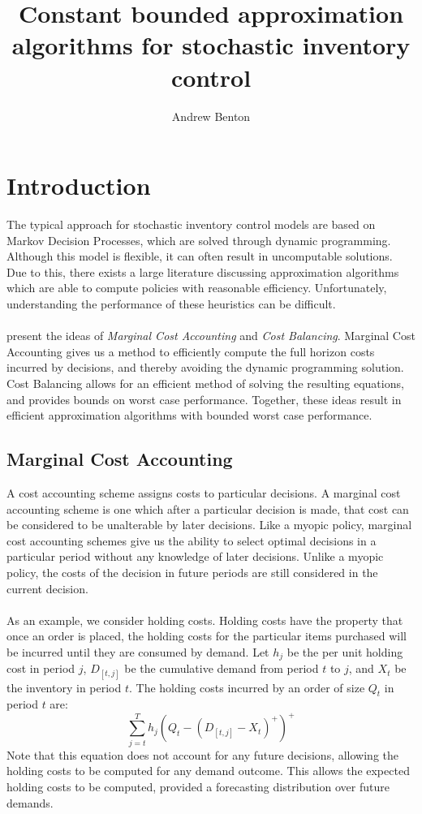 \documentclass[12pt]{article}
\author{Andrew Benton}
\title{Constant bounded approximation algorithms for stochastic inventory control}
\begin{document}
\maketitle

\section{Introduction}

The typical approach for stochastic inventory control models are based on Markov Decision Processes, which are solved through dynamic programming. Although this model is flexible, it can often result in uncomputable solutions. Due to this, there exists a large literature discussing approximation algorithms which are able to compute policies with reasonable efficiency. Unfortunately, understanding the performance of these heuristics can be difficult.\\
\\ 
\cite{levi:2007} present the ideas of \textit{Marginal Cost Accounting} and \textit{Cost Balancing}. Marginal Cost Accounting gives us a method to efficiently compute the full horizon costs incurred by decisions, and thereby avoiding the dynamic programming solution. Cost Balancing allows for an efficient method of solving the resulting equations, and provides bounds on worst case performance. Together, these ideas result in efficient approximation algorithms with bounded worst case performance. 


\subsection{Marginal Cost Accounting}

A cost accounting scheme assigns costs to particular decisions. A marginal cost accounting scheme is one which after a particular decision is made, that cost can be considered to be unalterable by later decisions. Like a myopic policy, marginal cost accounting schemes give us the ability to select optimal decisions in a particular period without any knowledge of later decisions. Unlike a myopic policy, the costs of the decision in future periods are still considered in the current decision. \\
\\
As an example, we consider holding costs. Holding costs have the property that once an order is placed, the holding costs for the particular items purchased will be incurred until they are consumed by demand. Let $h_j$ be the per unit holding cost in period $j$, $D_{[t,j]}$ be the cumulative demand from period $t$ to $j$, and $X_t$ be the inventory in period $t$. The holding costs incurred by an order of size $Q_t$ in period $t$ are:
$$
	\sum_{j=t}^T h_j (Q_t - (D_{[t,j]} - X_t)^+)^+
$$
Note that this equation does not account for any future decisions, allowing the holding costs to be computed for any demand outcome. This allows the expected holding costs to be computed, provided a forecasting distribution over future demands.
\end{document}
